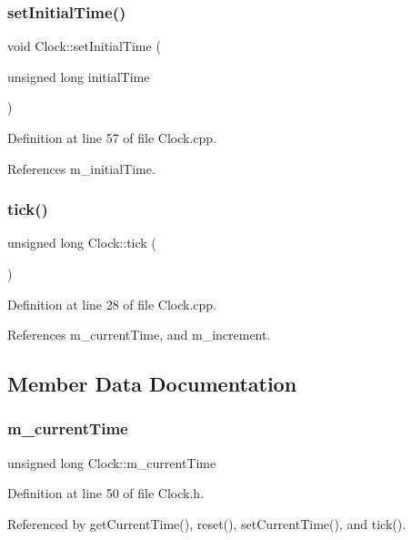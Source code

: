 \subsubsection{setInitialTime()}
{\footnotesize\ttfamily void Clock\+::set\+Initial\+Time (\begin{DoxyParamCaption}\item[{unsigned long}]{initial\+Time }\end{DoxyParamCaption})}



Definition at line 57 of file Clock.\+cpp.



References m\+\_\+initial\+Time.

\mbox{\label{class_clock_ab7c857c5b43cf98d991435ba9ce46b2c}} 
\subsubsection{tick()}
{\footnotesize\ttfamily unsigned long Clock\+::tick (\begin{DoxyParamCaption}{ }\end{DoxyParamCaption})}



Definition at line 28 of file Clock.\+cpp.



References m\+\_\+current\+Time, and m\+\_\+increment.



\subsection{Member Data Documentation}
\mbox{\label{class_clock_a73bf4edfc8f0fe2548ef6956f68b678e}} 
\subsubsection{m\_currentTime}
{\footnotesize\ttfamily unsigned long Clock\+::m\+\_\+current\+Time\hspace{0.3cm}{\ttfamily [private]}}



Definition at line 50 of file Clock.\+h.



Referenced by get\+Current\+Time(), reset(), set\+Current\+Time(), and tick().

